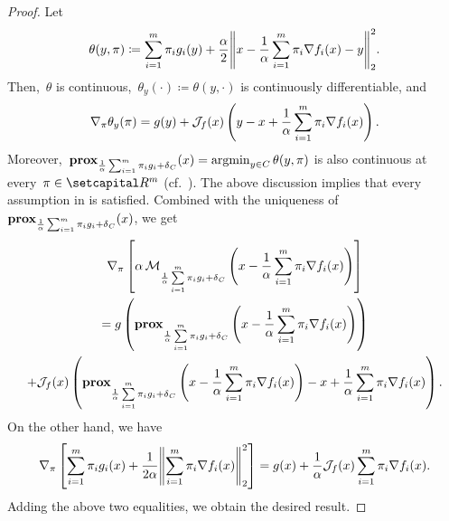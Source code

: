 \documentclass[../../main]{subfiles}
\begin{document}
                        \begin{proof}
                            Let
                            \begin{equation}
                                \theta(y, \pi) \coloneqq \sum_{i = 1}^{m} \pi_i g_i(y) + \frac{\alpha}{2} \norm*{x - \frac{1}{\alpha} \sum_{i = 1}^{m} \pi_i \nabla f_i(x) - y}_2^2
                            .\end{equation} 
                            Then,~$\theta$ is continuous,~$\theta_y(\cdot) \coloneqq \theta(y, \cdot)$ is continuously differentiable, and
                            \begin{equation}
                                \nabla_\pi \theta_y(\pi) = g(y) + \mathcal{J}_{f}(x) \left( y - x + \frac{1}{\alpha} \sum_{i = 1}^{m} \pi_i \nabla f_i(x) \right) 
                            .\end{equation} 
                            Moreover,~$\operatorname{\mathbf{prox}}_{\frac{1}{\alpha} \sum_{i = 1}^{m} \pi_i g_i + \operatorname{\delta}_C}(x) = \operatorname*{argmin}_{y \in C} \theta(y, \pi)$ is also continuous at every~$\pi \in \setR^m$ (cf.~\cite[Excercise 7.38]{Rockafellar1998}).
                            The above discussion implies that every assumption in  is satisfied.
                            Combined with the uniqueness of~$\operatorname{\mathbf{prox}}_{\frac{1}{\alpha} \sum_{i = 1}^{m} \pi_i g_i + \operatorname{\delta}_C}(x)$, we get
                            \begin{multline}
                                \nabla_\pi \left[ \alpha \operatorname{\mathcal{M}}_{\frac{1}{\alpha} \sum\limits_{i = 1}^{m} \pi_i g_i + \operatorname{\delta}_C}\left( x - \frac{1}{\alpha} \sum_{i = 1}^{m} \pi_i \nabla f_i(x) \right) \right] \\
                                = g\left( \operatorname{\mathbf{prox}}_{\frac{1}{\alpha} \sum\limits_{i = 1}^{m} \pi_i g_i + \operatorname{\delta}_C}\left( x - \frac{1}{\alpha} \sum_{i = 1}^{m} \pi_i \nabla f_i(x) \right) \right) \\
                                + \mathcal{J}_{f}(x) \left( \operatorname{\mathbf{prox}}_{\frac{1}{\alpha} \sum\limits_{i = 1}^{m} \pi_i g_i + \operatorname{\delta}_C}\left( x - \frac{1}{\alpha} \sum_{i = 1}^{m} \pi_i \nabla f_i(x) \right) - x + \frac{1}{\alpha} \sum_{i = 1}^{m} \pi_i \nabla f_i(x) \right) 
                            .\end{multline}
                            On the other hand, we have
                            \begin{equation}
                                \nabla_\pi \left[ \sum_{i = 1}^{m} \pi_i g_i(x) + \frac{1}{2 \alpha} \norm*{\sum_{i = 1}^{m} \pi_i \nabla f_i(x)}_2^2 \right] = g(x) + \frac{1}{\alpha} \jdv{f}{x} \sum_{i = 1}^{m} \pi_i \nabla f_i(x) 
                            .\end{equation} 
                            Adding the above two equalities, we obtain the desired result.
                        \end{proof}
\end{document}
